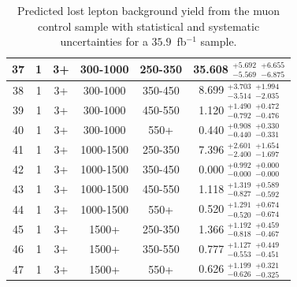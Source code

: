 \begin{table}[htbp]
\fontsize{10 pt}{1.2 em}
\selectfont
\begin{centering}
\caption{\label{tab:LLpredmu2} Predicted lost lepton background yield from the muon control sample with statistical and systematic uncertainties for a $35.9$~fb$^{-1}$ sample.}
\hspace*{-4ex}
\begin{tabular}{|c|c|c|c|c||c|}
\hline
37 &               1 &              3+ &        300-1000 &         250-350 & 35.608 $^{+5.692}_{-5.569}$ $^{+6.655}_{-6.875}$ \\ 
\hline
38 &               1 &              3+ &        300-1000 &         350-450 & 8.699 $^{+3.703}_{-3.514}$ $^{+1.994}_{-2.035}$ \\ 
\hline
39 &               1 &              3+ &        300-1000 &         450-550 & 1.120 $^{+1.490}_{-0.792}$ $^{+0.472}_{-0.476}$ \\ 
\hline
40 &               1 &              3+ &        300-1000 &            550+ & 0.440 $^{+0.908}_{-0.440}$ $^{+0.330}_{-0.331}$ \\ 
\hline
41 &               1 &              3+ &       1000-1500 &         250-350 & 7.396 $^{+2.601}_{-2.400}$ $^{+1.654}_{-1.697}$ \\ 
\hline
42 &               1 &              3+ &       1000-1500 &         350-450 & 0.000 $^{+0.992}_{-0.000}$ $^{+0.000}_{-0.000}$ \\ 
\hline
43 &               1 &              3+ &       1000-1500 &         450-550 & 1.118 $^{+1.319}_{-0.827}$ $^{+0.589}_{-0.592}$ \\ 
\hline
44 &               1 &              3+ &       1000-1500 &            550+ & 0.520 $^{+1.291}_{-0.520}$ $^{+0.674}_{-0.674}$ \\ 
\hline
45 &               1 &              3+ &           1500+ &         250-350 & 1.366 $^{+1.192}_{-0.818}$ $^{+0.459}_{-0.467}$ \\ 
\hline
46 &               1 &              3+ &           1500+ &         350-550 & 0.777 $^{+1.127}_{-0.553}$ $^{+0.449}_{-0.451}$ \\ 
\hline
47 &               1 &              3+ &           1500+ &            550+ & 0.626 $^{+1.199}_{-0.626}$ $^{+0.321}_{-0.325}$ \\ 
\hline
\end{tabular}
\par\end{centering}
\end{table}

